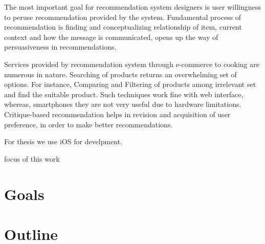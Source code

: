 The most important goal for recommendation system designers is user willingness to peruse recommendation provided by the system. Fundamental process of recommendation is finding and conceptualizing relationship of item, current context and how the message is communicated, opens up the way of persuasiveness in recommendations.\newline

Services provided by recommendation system through e-commerce to cooking are numerous in nature. Searching of products returns an overwhelming set of options. For instance, Comparing and Filtering of products among irrelevant set and find the suitable product. Such techniques work fine with web interface, whereas, smartphones they are not very useful due to hardware limitations. Critique-based recommendation helps in revision and acquisition of user preference, in order to make better recommendations.\newline


For thesis we use iOS for develpment.

focus of  this work

\section{Goals}

\section{Outline}